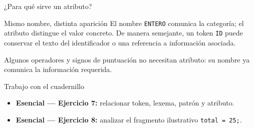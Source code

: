\documentclass[11pt,spanish]{beamer}
\newcommand{\actividad}[1]{\textbf{\textcolor{Rojo}{#1}}}
\begin{document}
\begin{frame}{¿Para qué sirve un atributo?}
\vfill

\begin{center}
\end{center}

\bigskip

\begin{block}{Mismo nombre, distinta aparición}
El nombre \texttt{ENTERO} comunica la categoría; el atributo distingue el valor concreto. De manera semejante, un token \texttt{ID} puede conservar el texto del identificador o una referencia a información asociada.
\end{block}

\bigskip

\begin{center}
\small Algunos operadores y signos de puntuación no necesitan atributo: su nombre ya comunica la información requerida.
\end{center}

\vfill
\end{frame}

\begin{frame}{Trabajo con el cuadernillo}
\vfill

\begin{center}
\end{center}

\bigskip

\begin{itemize}
\item \textbf{Esencial --- Ejercicio 7:} relacionar token, lexema, patrón y atributo.
\item \textbf{Esencial --- Ejercicio 8:} analizar el fragmento ilustrativo \texttt{total = 25;}.
\end{itemize}

\vfill
\end{frame}
\end{document}
